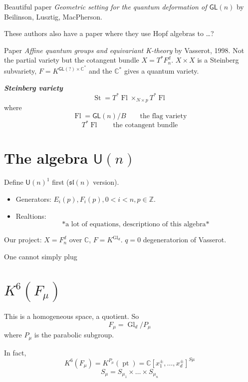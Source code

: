 \begin{thing4}{Beautiful paper}\leavevmode
	\textit{Geometric setting for the quantum deformation of $\mathsf{GL}(n)$} by Beilinson, Lusztig, MacPherson. 
\end{thing4}

\begin{remark}[Altan]\leavevmode
	These authors also have a paper where they use Hopf algebras to …?
\end{remark}

\begin{thing4}{Paper}\leavevmode
	\textit{Affine quantum groups and equivariant K-theory} by Vasserot, 1998. Not the partial variety but the cotangent bundle $X=T^*F_n^d$. $X\times X$ is a Steinberg subvariety, $F=K^{\mathsf{GL}(?)\times \mathbb{C}^{*}}$ and the $\mathbb{C}^*$ gives a quantum variety.
\end{thing4}

\begin{defn}[Altan]\leavevmode
	\textit{\textbf{Steinberg variety}}
	 \[\operatorname{St}=T^*\operatorname{Fl}\times_{N\times p}T^*\operatorname{Fl}\]
	 where \[\operatorname{Fl}=\mathsf{GL}(n)/B\qquad \text{the flag variety} \]
	 \[T^*\operatorname{Fl}\qquad \text{the cotangent bundle} \]
\end{defn}

\section{The algebra $\mathsf{U}(n)$}
Define $\mathsf{U}(n)^1$ first ($\mathfrak{sl}(n)$ version).

\begin{itemize}
\item Generators: $E_i(p),F_i(p), 0<i<n,p\in\mathbb{Z}$.
\item Realtions:
	\[\text{*a lot of equations, descriptiono of this algebra*} \]
	
\end{itemize}

\begin{thing6}{Our project:}\leavevmode
	$X=F_n^d$ over $\mathbb{C}$, $F=K^{\operatorname{Gl}_d}$. $q=0$ degeneratorion of Vasserot.
\end{thing6}

\begin{remark}\leavevmode
	One cannot simply plug
\end{remark}

\section{$K^6(F_\mu)$}
This is a homogeneous space, a quotient. So
\[F_\mu=\operatorname{Gl}_d/P_\mu\]
where $P_\mu$ is the parabolic subgroup.

In fact,
\[K^6(F_\mu)=K^{P_\mu}(\operatorname{pt})=\mathbb{C}[x_1^\pm ,\ldots,x_d^\pm]^{S\mu} \]
\[S_\mu=S_{\mu_1}\times \ldots \times S_{\mu_n}\]




